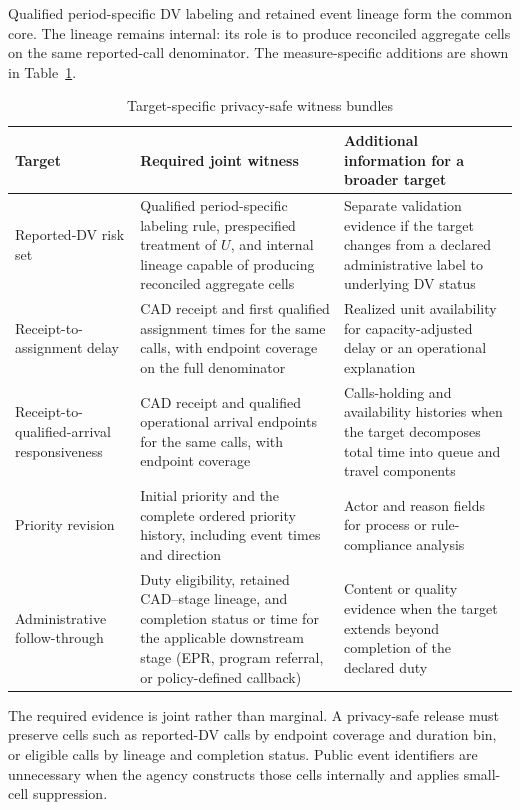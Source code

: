 \documentclass[11pt]{article}
\begin{document}
Qualified period-specific DV labeling and retained event lineage form the common core. The lineage remains internal: its role is to produce reconciled aggregate cells on the same reported-call denominator. The measure-specific additions are shown in Table~\ref{tab:witness_bundles}.

\begin{table}[H]
\centering
\caption{Target-specific privacy-safe witness bundles}
\label{tab:witness_bundles}
\begin{tabularx}{\textwidth}{@{}>{\raggedright\arraybackslash}p{2.75cm} X X@{}}
\toprule
Target & Required joint witness & Additional information for a broader target \\
\midrule
Reported-DV risk set &
Qualified period-specific labeling rule, prespecified treatment of $U$, and internal lineage capable of producing reconciled aggregate cells &
Separate validation evidence if the target changes from a declared administrative label to underlying DV status \\
\addlinespace
Receipt-to-assignment delay &
CAD receipt and first qualified assignment times for the same calls, with endpoint coverage on the full denominator &
Realized unit availability for capacity-adjusted delay or an operational explanation \\
\addlinespace
Receipt-to-qualified-arrival responsiveness &
CAD receipt and qualified operational arrival endpoints for the same calls, with endpoint coverage &
Calls-holding and availability histories when the target decomposes total time into queue and travel components \\
\addlinespace
Priority revision &
Initial priority and the complete ordered priority history, including event times and direction &
Actor and reason fields for process or rule-compliance analysis \\
\addlinespace
Administrative follow-through &
Duty eligibility, retained CAD--stage lineage, and completion status or time for the applicable downstream stage (EPR, program referral, or policy-defined callback) &
Content or quality evidence when the target extends beyond completion of the declared duty \\
\bottomrule
\end{tabularx}
\end{table}

The required evidence is joint rather than marginal. A privacy-safe release must preserve cells such as reported-DV calls by endpoint coverage and duration bin, or eligible calls by lineage and completion status. Public event identifiers are unnecessary when the agency constructs those cells internally and applies small-cell suppression.
\end{document}

